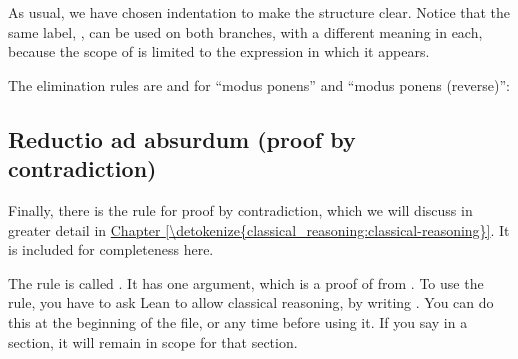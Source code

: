\documentclass[letterpaper,10pt,english]{sphinxmanual}
\begin{document}
\sphinxAtStartPar
As usual, we have chosen indentation to make the structure clear. Notice that the same label, , can be used on both branches, with a different meaning in each, because the scope of  is limited to the expression in which it appears.

\sphinxAtStartPar
The elimination rules are  and  for “modus ponens”
and “modus ponens (reverse)”:

\begin{sphinxVerbatim}[commandchars=\\\{\}]
     
   

      

     
   

      
\end{sphinxVerbatim}


\subsection{Reductio ad absurdum (proof by contradiction)}
\label{\detokenize{propositional_logic_in_lean:reductio-ad-absurdum-proof-by-contradiction}}
\sphinxAtStartPar
Finally, there is the rule for proof by contradiction, which we will discuss in greater detail in \hyperref[\detokenize{classical_reasoning:classical-reasoning}]{Chapter \ref{\detokenize{classical_reasoning:classical-reasoning}}}. It is included for completeness here.

\sphinxAtStartPar
The rule is called .
It has one argument, which is a proof of  from .
To use the rule, you have to ask Lean to allow classical reasoning,
by writing .
You can do this at the beginning of the file,
or any time before using it.
If you say  in a section,
it will remain in scope for that section.
\end{document}
